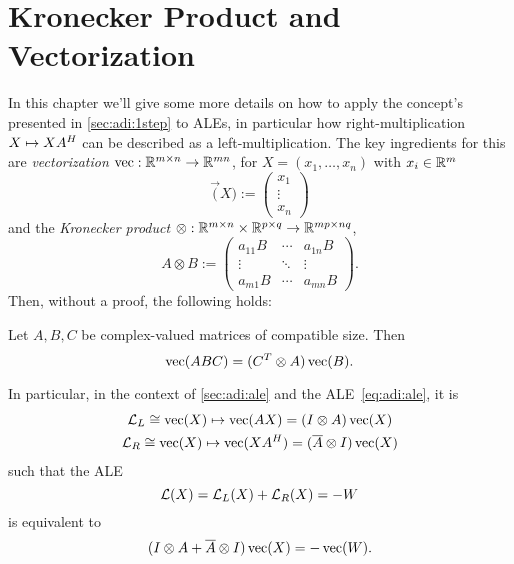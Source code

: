 \chapter{Kronecker Product and Vectorization}
\label{sec:vectorization}

In this chapter we'll give some more details on how to apply the concept's presented in \autoref{sec:adi:1step} to \acp{ALE},
in particular how right-multiplication $X \mapsto XA^H$ can be described as a left-multiplication.
The key ingredients for this are \emph{vectorization} $\operatorname{vec} : \mathbb{R}^{m\times n} \to \mathbb{R}^{mn}$,
\eg for $X=(x_1,\ldots, x_n)$ with $x_i\in\mathbb{R}^m$
\begin{equation}
  \vec(X) := \begin{pmatrix}
    x_1 \\
    \vdots \\
    x_n
  \end{pmatrix}
\end{equation}
and the \emph{Kronecker product} $\otimes : \mathbb{R}^{m\times n} \times \mathbb{R}^{p\times q} \to \mathbb{R}^{mp \times nq}$,
\begin{equation}
  A \otimes B := \begin{pmatrix}
    a_{11} B & \cdots & a_{1n} B \\
    \vdots   & \ddots & \vdots \\
    a_{m1} B & \cdots & a_{mn} B
  \end{pmatrix}
  .
\end{equation}
Then, without a proof, the following holds:

\begin{proposition}
  Let $A, B, C$ be complex-valued matrices of compatible size. Then
  \begin{equation*}
    \operatorname{vec}(ABC) = (C^T \otimes A) \operatorname{vec}(B)
    .
  \end{equation*}
\end{proposition}

In particular, in the context of \autoref{sec:adi:ale}
and the \ac{ALE}~\eqref{eq:adi:ale}, it is
\begin{gather}
  \Lyap_L \cong \vec(X) \mapsto \vec(AX) = (I \otimes A) \vec(X) \\
  \Lyap_R \cong \vec(X) \mapsto \vec(XA^\HT) = (\conj A \otimes I) \vec(X)
\end{gather}
such that the \ac{ALE}
\begin{equation}
  \operatorname{\mathcal L}(X) = \operatorname{\mathcal L}_L(X) + \operatorname{\mathcal L}_R(X) = -W
\end{equation}
is equivalent to
\begin{equation}
  (I \otimes A + \conj A \otimes I) \vec(X) = -\vec(W)
  .
\end{equation}

